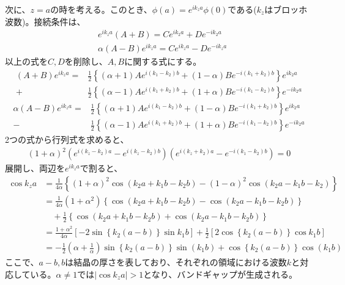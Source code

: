 \documentclass[a4paper,11pt,dvipdfmx]{jsarticle}
\begin{document}
\begin{enumerate}
    次に、$z = a$の時を考える。このとき、$\phi(a) = e^{i k_z a} \phi (0)$である($k_z$はブロッホ波数)。接続条件は、
    \begin{align*}
      & e^{i k_z a} (A + B) = C e^{i k_2 a} + D e^{- i k_2 a} \\
      & \alpha (A - B) e^{i k_z a} = C e^{i k_z a} - D e^{- i k_z a}
    \end{align*}
    以上の式を$C, D$を削除し、$A, B$に関する式にする。
    \begin{align*}
      (A + B) e^{i k_z a} = & \frac{1}{2} \left\{ \left( \alpha + 1 \right) A e^{i \left( k_1 - k_2 \right) b } + \left( 1 - \alpha \right) B e^{- i \left( k_1 + k_2 \right) b } \right\} e^{i k_2 a} 
      \\ + & \frac{1}{2} \left\{ \left( \alpha - 1 \right) A e^{i \left( k_1 + k_2 \right) b} + \left( 1 + \alpha \right) B e^{- i (k_1 - k_2)b} \right\} e^{- i k_2 a} 
    \end{align*}
    \begin{align*}
      \alpha (A - B) e^{i k_z a} = & \frac{1}{2} \left\{ \left( \alpha + 1 \right) A e^{i \left( k_1 - k_2 \right) b } + \left( 1 - \alpha \right) B e^{- i \left( k_1 + k_2 \right) b } \right\} e^{i k_2 a} 
      \\ - & \frac{1}{2} \left\{ \left( \alpha - 1 \right) A e^{i \left( k_1 + k_2 \right) b} + \left( 1 + \alpha \right) B e^{- i (k_1 - k_2)b} \right\} e^{- i k_2 a}
    \end{align*}
    2つの式から行列式を求めると、
    \begin{align*}
      (1 + \alpha)^2 \left( e^{i (k_z - k_2)a} - e^{i(k_z - k_2)b} \right) \left( e^{i (k_z + k_2)a} - e^{- i(k_1 - k_2)b} \right) = 0
    \end{align*}
    展開し、両辺を$e^{i k_z a}$で割ると、
    \begin{align*}
      \cos k_z a &= \frac{1}{4 \alpha} \left\{ (1 + \alpha)^2 \cos \left( k_2 a + k_1 b - k_2 b \right) - (1 - \alpha)^2 \cos \left( k_2 a - k_1 b - k_2 \right) \right\} 
      \\
      &= \frac{1}{4 \alpha} (1 + \alpha^2) \left\{ \cos \left( k_2 a + k_1 b - k_2 b \right) - \cos \left( k_2 a - k_1 b - k_2 b \right) \right\} 
      \\
      &\quad + \frac{1}{2} \left\{ \cos \left( k_2 a + k_1 b - k_2 b \right) + \cos \left( k_2 a - k_1 b - k_2 b \right) \right\} 
      \\
      &= \frac{1 + \alpha^2}{4 \alpha} \left[ -2 \sin \left\{ k_2 \left( a - b \right) \right\} \sin k_1 b \right] + \frac{1}{2} \left[ 2 \cos \left\{ k_2 \left( a - b \right) \right\} \cos k_1 b \right]
      \\
      &= - \frac{1}{2} \left( \alpha + \frac{1}{\alpha} \right) \sin \left\{ k_2 \left( a - b \right) \right\} \sin (k_1 b) + \cos \left\{ k_2 \left( a - b \right) \right\} \cos (k_1 b)
    \end{align*}
    ここで、$a - b, b$は結晶の厚さを表しており、それぞれの領域における波数$k$と対応している。$\alpha \neq 1$では$| \cos k_z a | > 1$となり、バンドギャップが生成される。


\end{enumerate}
\end{document}
